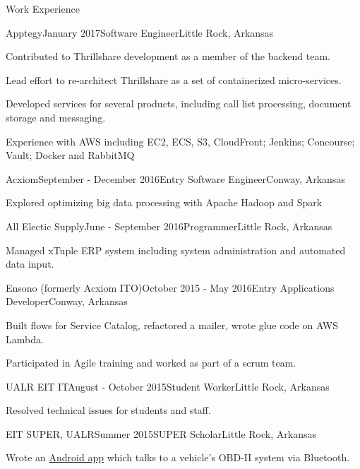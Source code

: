 \documentclass{resume} %
\begin{document}
\begin{rSection}{Work Experience}

\begin{rSubsection}{Apptegy}{January 2017}{Software Engineer}{Little Rock, Arkansas}
	\item Contributed to Thrillshare development as a member of the backend team.
	\item Lead effort to re-architect Thrillshare as a set of containerized micro-services.
	\item Developed services for several products, including call list processing, document storage and messaging.
	\item Experience with AWS including EC2, ECS, S3, CloudFront; Jenkins; Concourse; Vault; Docker and RabbitMQ
\end{rSubsection}

\begin{rSubsection}{Acxiom}{September - December 2016}{Entry Software Engineer}{Conway, Arkansas}
	\item Explored optimizing big data processing with Apache Hadoop and Spark
\end{rSubsection}


\begin{rSubsection}{All Electic Supply}{June - September 2016}{Programmer}{Little Rock, Arkansas}
	\item Managed xTuple ERP system including system administration and automated data input.
\end{rSubsection}

\begin{rSubsection}{Ensono (formerly Acxiom ITO)}{October 2015 - May 2016}{Entry Applications Developer}{Conway, Arkansas}
	\item Built flows for Service Catalog, refactored a mailer, wrote glue code on AWS Lambda.
	\item Participated in Agile training and worked as part of a scrum team.
\end{rSubsection}

\begin{rSubsection}{UALR EIT IT}{August - October 2015}{Student Worker}{Little Rock, Arkansas}
	\item Resolved technical issues for students and staff.
\end{rSubsection}

\begin{rSubsection}{EIT SUPER, UALR}{Summer 2015}{SUPER Scholar}{Little Rock, Arkansas}
	\item Wrote an \href{http://github.com/cptaffe/flamethrower}{Android app} which talks to a vehicle's OBD-II system via Bluetooth.
\end{rSubsection}


\end{rSection}
\end{document}

